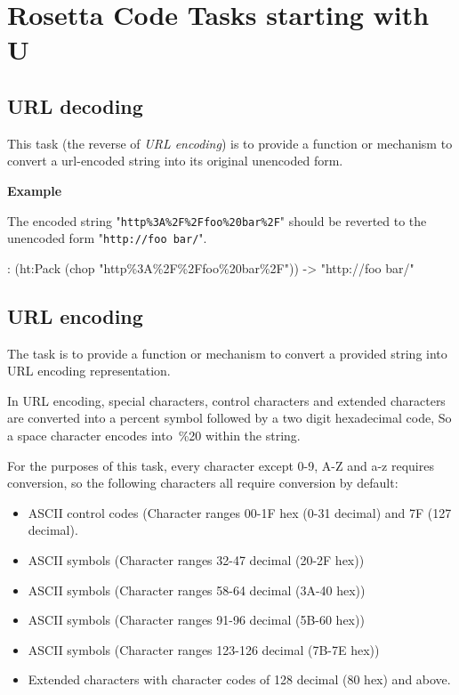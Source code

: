 %
%
%

\chapter{Rosetta Code Tasks starting with U}

\section*{URL decoding}


This task (the reverse of \emph{URL encoding}) is to provide a
function or mechanism to convert a url-encoded string into its
original unencoded form.

\textbf{Example}

The encoded string "\texttt{http\%3A\%2F\%2Ffoo\%20bar\%2F}" should be
reverted to the unencoded form "\texttt{http://foo bar/}".


\begin{wideverbatim}

: (ht:Pack (chop "http\%3A\%2F\%2Ffoo\%20bar\%2F"))
-> "http://foo bar/"

\end{wideverbatim}

\pagebreak{}
\section*{URL encoding}

The task is to provide a function or mechanism to convert a provided
string into URL encoding representation.

In URL encoding, special characters, control characters and extended
characters are converted into a percent symbol followed by a two digit
hexadecimal code, So a space character encodes into~\%20 within the
string.

For the purposes of this task, every character except 0-9, A-Z and a-z
requires conversion, so the following characters all require conversion
by default:

\begin{itemize}
\item
  ASCII control codes (Character ranges 00-1F hex (0-31 decimal) and 7F
  (127 decimal).
\item
  ASCII symbols (Character ranges 32-47 decimal (20-2F hex))
\item
  ASCII symbols (Character ranges 58-64 decimal (3A-40 hex))
\item
  ASCII symbols (Character ranges 91-96 decimal (5B-60 hex))
\item
  ASCII symbols (Character ranges 123-126 decimal (7B-7E hex))
\item
  Extended characters with character codes of 128 decimal (80 hex) and
  above.
\end{itemize}


